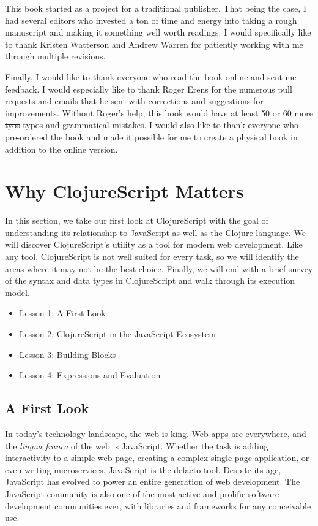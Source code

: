 \documentclass[10pt,twoside,openright]{memoir}
\begin{document}
This book started as a project for a traditional publisher. That being the case, I had several editors who invested a ton of time and energy into taking a rough manuscript and making it something well worth readings. I would specifically like to thank Kristen Watterson and Andrew Warren for patiently working with me through multiple revisions.

Finally, I would like to thank everyone who read the book online and sent me feedback. I would especially like to thank Roger Erens for the numerous pull requests and emails that he sent with corrections and suggestions for improvements. Without Roger's help, this book would have at least 50 or 60 more \sout{tyos} typos and grammatical mistakes. I would also like to thank everyone who pre-ordered the book and made it possible for me to create a physical book in addition to the online version.

\cleardoublepage

\mainmatter
\sloppy

{\let\newpage\relax\part{Why ClojureScript Matters}}

In this section, we take our first look at ClojureScript with the goal
of understanding its relationship to JavaScript as well as the Clojure
language. We will discover ClojureScript's utility as a tool for modern
web development. Like any tool, ClojureScript is not well suited for
every task, so we will identify the areas where it may not be the best
choice. Finally, we will end with a brief survey of the syntax and data
types in ClojureScript and walk through its execution model.

\begin{itemize}
\tightlist
\item Lesson 1: A First Look
\item Lesson 2: ClojureScript in the JavaScript Ecosystem
\item Lesson 3: Building Blocks
\item Lesson 4: Expressions and Evaluation
\end{itemize}

\chapter{A First Look}

In today's technology landscape, the web is king. Web apps are
everywhere, and the \emph{lingua franca} of the web is JavaScript.
Whether the task is adding interactivity to a simple web page, creating
a complex single-page application, or even writing microservices,
JavaScript is the defacto tool. Despite its age, JavaScript has evolved
to power an entire generation of web development. The JavaScript
community is also one of the most active and prolific software
development communities ever, with libraries and frameworks for any
conceivable use.
\end{document}
